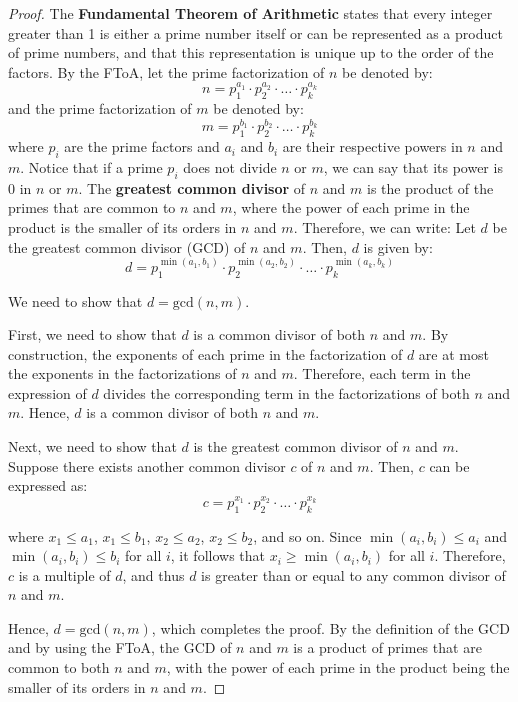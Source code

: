 \documentclass{article}
\renewcommand{\_}{\ifincsname_\else\legacyunderscore\fi}
\begin{document}
    \begin{proof}
        The \textbf{Fundamental Theorem of Arithmetic} states that every integer greater than 1 is either a prime number itself or can be represented as a product of prime numbers, and that this representation is unique up to the order of the factors. By the FToA, let the prime factorization of $n$ be denoted by:
        \[n=p_{1}^{a_1}\cdot p_{2}^{a_2}\cdot \hdots \cdot p_{k}^{a_k}\]
        and the prime factorization of $m$ be denoted by:
        \[m=p_{1}^{b_1}\cdot p_{2}^{b_2}\cdot \hdots \cdot p_{k}^{b_k}\]
        where $p_i$ are the prime factors and $a_i$ and $b_i$ are their respective powers in $n$ and $m$. Notice that if a prime $p_i$ does not divide $n$ or $m$, we can say that its power is $0$ in $n$ or $m$. The \textbf{greatest common divisor} of $n$ and $m$ is the product of the primes that are common to $n$ and $m$, where the power of each prime in the product is the smaller of its orders in $n$ and $m$. Therefore, we can write:
        Let $d$ be the greatest common divisor (GCD) of $n$ and $m$. Then, $d$ is given by:
\[
d = p_1^{\min(a_1, b_1)} \cdot p_2^{\min(a_2, b_2)} \cdot \ldots \cdot p_k^{\min(a_k, b_k)}
\]

We need to show that $d = \text{gcd}(n, m)$.

First, we need to show that $d$ is a common divisor of both $n$ and $m$. By construction, the exponents of each prime in the factorization of $d$ are at most the exponents in the factorizations of $n$ and $m$. Therefore, each term in the expression of $d$ divides the corresponding term in the factorizations of both $n$ and $m$. Hence, $d$ is a common divisor of both $n$ and $m$.

Next, we need to show that $d$ is the greatest common divisor of $n$ and $m$. Suppose there exists another common divisor $c$ of $n$ and $m$. Then, $c$ can be expressed as:
\[
c = p_1^{x_1} \cdot p_2^{x_2} \cdot \ldots \cdot p_k^{x_k}
\]

where $x_1 \leq a_1$, $x_1 \leq b_1$, $x_2 \leq a_2$, $x_2 \leq b_2$, and so on. Since $\min(a_i, b_i) \leq a_i$ and $\min(a_i, b_i) \leq b_i$ for all $i$, it follows that $x_i \geq \min(a_i, b_i)$ for all $i$. Therefore, $c$ is a multiple of $d$, and thus $d$ is greater than or equal to any common divisor of $n$ and $m$.

Hence, $d = \text{gcd}(n, m)$, which completes the proof. By the definition of the GCD and by using the FToA, the GCD of $n$ and $m$ is a product of primes that are common to both $n$ and $m$, with the power of each prime in the product being the smaller of its orders in $n$ and $m$.

    \end{proof}
\end{document}
